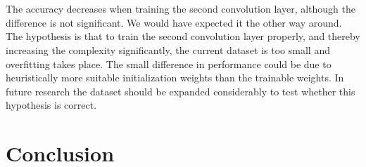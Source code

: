 \documentclass[a4paper,onecolumn]{report}
\begin{document}
\\\\
The accuracy decreases when training the second convolution layer, although the difference is not significant. We would have expected it the other way around. The hypothesis is that to train the second convolution layer properly, and thereby increasing the complexity significantly, the current dataset is too small and overfitting takes place. The small difference in performance could be due to heuristically more suitable initialization weights than the trainable weights. In future research the dataset should be expanded considerably to test whether this hypothesis is correct. 

\chapter{Conclusion}



\end{document}
